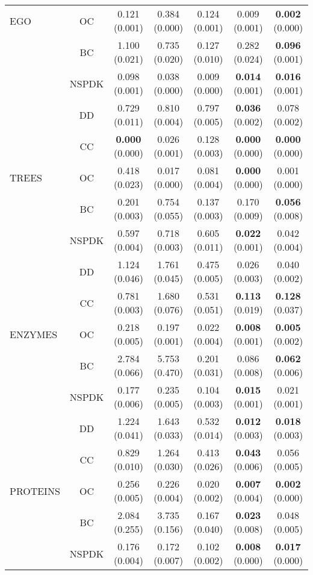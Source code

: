 \begin{table}[h!]
{\begin{tabular}{lcccccc}
EGO       & OC           & 0.121 (0.001) & 0.384 (0.000) & 0.124 (0.001) & 0.009 (0.001) & \textbf{0.002} (0.000)\\
          & BC           & 1.100 (0.021) & 0.735 (0.020) & 0.127 (0.010) & 0.282 (0.024) & \textbf{0.096} (0.001)\\
          & NSPDK        & 0.098 (0.001) & 0.038 (0.000) & 0.009 (0.000) & \textbf{0.014} (0.001) & \textbf{0.016} (0.001)\\
        \midrule
          & DD           & 0.729 (0.011) & 0.810 (0.004) & 0.797 (0.005) & \textbf{0.036} (0.002) & 0.078 (0.002)\\
          & CC           & \textbf{0.000} (0.000) & 0.026 (0.001) & 0.128 (0.003) & \textbf{0.000} (0.000) & \textbf{0.000} (0.000)\\
TREES     & OC           & 0.418 (0.023) & 0.017 (0.000) & 0.081 (0.004) & \textbf{0.000} (0.000) & 0.001 (0.000)\\
          & BC           & 0.201 (0.003) & 0.754 (0.055) & 0.137 (0.003) & 0.170 (0.009) & \textbf{0.056} (0.008)\\
          & NSPDK        & 0.597 (0.004) & 0.718 (0.003) & 0.605 (0.011) & \textbf{0.022} (0.001) & 0.042 (0.004)\\
        \midrule
          & DD           & 1.124 (0.046) & 1.761 (0.045) & 0.475 (0.005) & 0.026 (0.003) & 0.040 (0.002)\\
          & CC           & 0.781 (0.003) & 1.680 (0.076) & 0.531 (0.051) & \textbf{0.113} (0.019) & \textbf{0.128} (0.037)\\
ENZYMES   & OC           & 0.218 (0.005) & 0.197 (0.001) & 0.022 (0.004) & \textbf{0.008} (0.001) & \textbf{0.005} (0.002)\\
          & BC           & 2.784 (0.066) & 5.753 (0.470) & 0.201 (0.031) & 0.086 (0.008) & \textbf{0.062} (0.006)\\
          & NSPDK        & 0.177 (0.006) & 0.235 (0.005) & 0.104 (0.003) & \textbf{0.015} (0.001) & 0.021 (0.001)\\
        \midrule
          & DD           & 1.224 (0.041) & 1.643 (0.033) & 0.532 (0.014) & \textbf{0.012} (0.003) & \textbf{0.018} (0.003)\\
          & CC           & 0.829 (0.010) & 1.264 (0.030) & 0.413 (0.026) & \textbf{0.043} (0.006) & 0.056 (0.005)\\
PROTEINS  & OC           & 0.256 (0.005) & 0.226 (0.004) & 0.020 (0.002) & \textbf{0.007} (0.004) & \textbf{0.002} (0.000)\\
          & BC           & 2.084 (0.255) & 3.735 (0.156) & 0.167 (0.040) & \textbf{0.023} (0.008) & 0.048 (0.005)\\
          & NSPDK        & 0.176 (0.004) & 0.172 (0.007) & 0.102 (0.002) & \textbf{0.008} (0.000) & \textbf{0.017} (0.000)\\
        \bottomrule

    \end{tabular}}
\end{table}